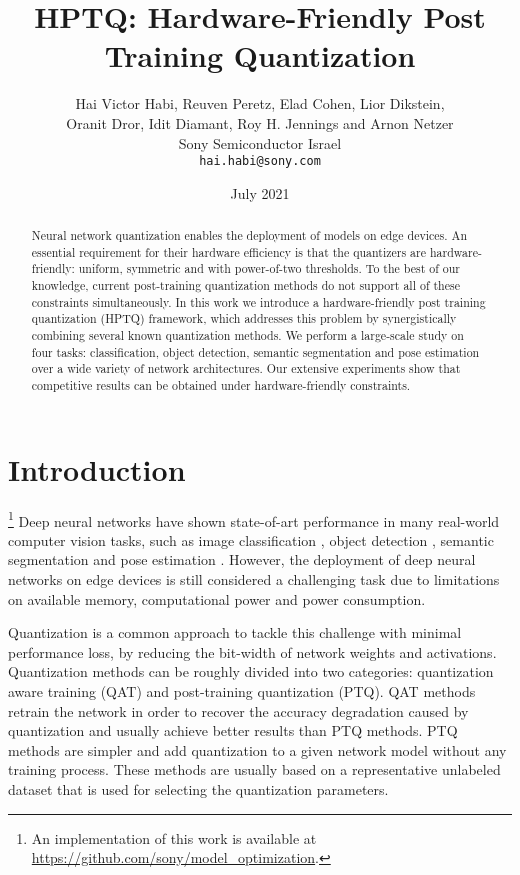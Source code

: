 \documentclass{article}
\title{HPTQ: Hardware-Friendly Post Training Quantization}
\author{Hai Victor Habi, Reuven Peretz, Elad Cohen, Lior Dikstein, \\ Oranit Dror, Idit Diamant, Roy H. Jennings and Arnon Netzer\\
Sony Semiconductor Israel\\
{\tt\small hai.habi@sony.com}\\
}
\date{July 2021}
\begin{document}
\maketitle
\begin{abstract}
     Neural network quantization enables the deployment of models on edge devices. 
     An essential requirement for their hardware efficiency is that the quantizers are hardware-friendly: uniform, symmetric and with power-of-two thresholds. 
     To the best of our knowledge, current post-training quantization methods do not support all of these constraints simultaneously.
     In this work we introduce a hardware-friendly post training quantization (HPTQ) framework, which addresses this problem by synergistically combining several known quantization methods.
We perform a large-scale study on four tasks: classification, object detection, semantic segmentation and pose estimation over a wide variety of network architectures.
     Our extensive experiments show that competitive results can be obtained under hardware-friendly constraints.
\end{abstract}



     


\section{Introduction}
{\let\thefootnote\relax\footnote{{An implementation of this work is available at \url{https://github.com/sony/model_optimization}.}}}
Deep neural networks have shown state-of-art performance in many real-world computer vision tasks, such as image classification \cite{he2016deep,howard2017mobilenets}, object detection \cite{ren2015faster,liu2016ssd,lin2017feature}, semantic segmentation \cite{chen2017rethinking} and pose estimation \cite{zhang2019simple,cao2019openpose}. However, the deployment of deep neural networks on edge devices is still considered a challenging task due to limitations on available memory, computational power and power consumption.

Quantization \cite{gholami2021survey} is a common approach to tackle this challenge with minimal performance loss, by reducing the bit-width of network weights and activations.
Quantization methods can be roughly divided into two categories: quantization aware training (QAT) and post-training quantization (PTQ).  
QAT methods \cite{jacob2018quantization,jain2019trained,choi2018pact,gong2019differentiable} retrain the network in order to recover the accuracy degradation caused by quantization and usually achieve better results than PTQ methods. 
PTQ methods \cite{banner2018post,cai2020zeroq,nagel2020up,fang2020post} are simpler and add quantization to a given network model without any training process. 
These methods are usually based on a representative unlabeled dataset that is used for selecting the quantization parameters. 
\end{document}
